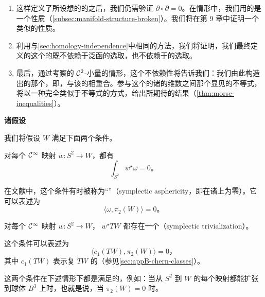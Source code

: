 \begin{enumerate}[label=(\arabic*)]
\item 这样定义了所设想的\trComplex{}的\trDifferential{}之后，我们仍需验证 $\partial\circ\partial=0$。在\trMorse{}情形中，我们用的是一个\trGluing{}性质（\cref{subsec:manifold-structure-broken}）。我们将在第 9 章中证明一个类似的性质。
\item 利用与\cref{sec:homology-independence}中相同的方法，我们将证明，我们最终定义的这个\trComplex{}的\trHomology{}既不依赖于泛函的选取，也不依赖于\trVectorField{}的选取。
\item 最后，通过考察\trAutonomous{}的 $\mathcal{C}^2$-小\trHamiltonian{}量的情形，这个不依赖性将告诉我们：我们由此构造出的那个\trHomology，即\trFloerHomology，与该\trManifold{}的\trMorseHomology{}相重合。参与这个\trComplex{}的诸\trVectorSpace{}的维数之间那个显见的不等式，将以一种完全类似于\trMorse{}不等式的方式，给出所期待的结果（\cref{thm:morse-inequalities}）。
\end{enumerate}

\textbf{诸假设}

我们将假设\trSymplectic\trManifold{} $W$ 满足下面两个条件。

\begin{assumption}\label{thm:symplectic-asphericity}
对每个 $\mathcal{C}^\infty$ 映射 $w\colon S^2\to W$，都有
\[
\int_{S^2}w^\star\omega=0\text{。}
\]
\end{assumption}

在文献中，这个条件有时被称为“\textbf{\trSymplectic\trAsphericity}”（symplectic asphericity，即\trSymplecticForm{}在诸\trSphere{}上为零）。它可以表述为
\[
\langle\omega,\pi_2(W)\rangle=0\text{。}
\]

\begin{assumption}\label{thm:symplectic-trivialization}
对每个 $\mathcal{C}^\infty$ 映射 $w\colon S^2\to W$，\trFiberBundle{} $w^\star TW$ 都存在一个\textbf{\trSymplectic{}\trTrivialization}（symplectic trivialization）。
\end{assumption}

这个条件可以表述为
\[
\langle c_1(TW),\pi_2(W)\rangle=0\text{，}
\]
其中 $c_1(TW)$ 表示复\trVectorBundle{} $TW$ 的\trFirstChernClass（参见\cref{sec:appB-chern-classes}）。

这两个条件在下述情形下都是满足的，例如：当从 $S^2$ 到 $W$ 的每个映射都能扩张到球体 $B^3$ 上时，也就是说，当 $\pi_2(W)=0$ 时。
